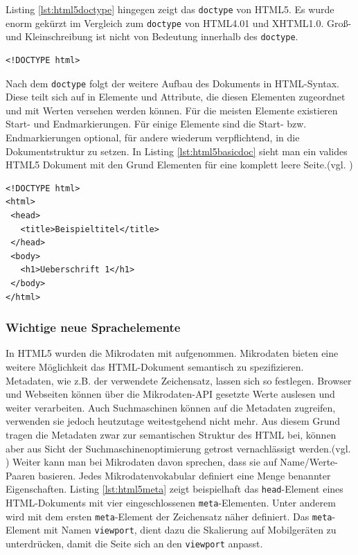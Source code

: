 Listing \ref{lst:html5doctype}	hingegen zeigt das \texttt{doctype} von HTML5. Es wurde enorm gekürzt im Vergleich zum \texttt{doctype} von HTML4.01 und XHTML1.0. Groß- und Kleinschreibung ist nicht von Bedeutung innerhalb des \texttt{doctype}. 

\vspace{1em}
\begin{lstlisting}[language=HTML5, caption=HTML5 \texttt{doctype}-Element, label=lst:html5doctype]
<!DOCTYPE html>
\end{lstlisting}		
	
Nach dem \texttt{doctype} folgt der weitere Aufbau des Dokuments in HTML-Syntax. Diese teilt sich auf in Elemente und Attribute, die diesen Elementen zugeordnet und mit Werten versehen werden können. Für die meisten Elemente existieren Start- und Endmarkierungen. Für einige Elemente sind die Start- bzw. Endmarkierungen optional, für andere wiederum verpflichtend, in die Dokumentstruktur zu setzen. In Listing \ref{lst:html5basicdoc} sieht man ein valides HTML5 Dokument mit den Grund Elementen für eine komplett leere Seite.(vgl. \cite[S.58]{KronHTML2011})

\vspace{1em}
\begin{lstlisting}[language=HTML5, caption=HTML5 Basis Dokument, label=lst:html5basicdoc]
<!DOCTYPE html>
<html>
 <head>
   <title>Beispieltitel</title>
 </head>
 <body>
   <h1>Ueberschrift 1</h1>
 </body>
</html>
\end{lstlisting}
	
\subsubsection{Wichtige neue Sprachelemente} In HTML5 wurden die Mikrodaten mit aufgenommen. Mikrodaten bieten eine weitere Möglichkeit das HTML-Dokument semantisch zu spezifizieren. Metadaten, wie z.B. der verwendete Zeichensatz, lassen sich so festlegen. Browser und Webseiten können über die Mikrodaten-API gesetzte Werte auslesen und weiter verarbeiten. Auch Suchmaschinen können auf die Metadaten zugreifen, verwenden sie jedoch heutzutage weitestgehend nicht mehr. Aus diesem Grund tragen die Metadaten zwar zur semantischen Struktur des HTML bei, können aber aus Sicht der Suchmaschinenoptimierung getrost vernachlässigt werden.(vgl. \cite{SelfHtml20142}) Weiter kann man bei Mikrodaten davon sprechen, \glqq [...] dass sie auf Name/Werte-Paaren basieren. Jedes Mikrodatenvokabular definiert eine Menge benannter Eigenschaften.\grqq{}\cite[S.174]{PilgDurc2011} Listing \ref{lst:html5meta} zeigt beispielhaft das \texttt{head}-Element eines HTML-Dokuments mit vier eingeschlossenen \texttt{meta}-Elementen. Unter anderem wird mit dem ersten \texttt{meta}-Element der Zeichensatz näher definiert. Das \texttt{meta}-Element mit Namen \texttt{viewport}, dient dazu die Skalierung auf Mobilgeräten zu unterdrücken, damit die Seite sich an den \texttt{viewport} anpasst.

